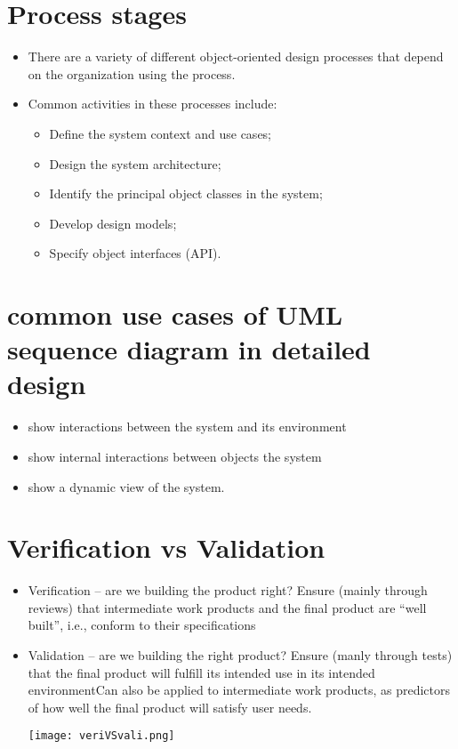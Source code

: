 \documentclass[../ESOF_notes.tex]{subfiles}
\begin{document}
\section{Process stages}
    \begin{itemize}
        \item There are a variety of different object-oriented design processes that depend on the organization using the process.
        \item Common activities in these processes include:
        \begin{itemize}
            \item Define the system context and use cases;
            \item Design the system architecture;
            \item Identify the principal object classes in the system;
            \item Develop design models;
            \item Specify object interfaces (API).
        \end{itemize}
    \end{itemize}

\section{common use cases of UML sequence diagram in detailed design}
\begin{itemize}
    \item show interactions between the system and its environment
    \item show internal interactions between objects the system
    \item show a dynamic view of the system.
\end{itemize}
    
\section{Verification vs Validation}
    \begin{itemize}
        \item Verification – are we building the product right?
        \newline Ensure (mainly through reviews) that intermediate work products and the final product are “well built”, i.e., conform to their specifications
        \item Validation – are we building the right product?\newline
        Ensure (manly through tests) that the final product will fulfill its intended use in its intended environment\newline Can also be applied to intermediate work products, as predictors of how well the final product will satisfy user needs.
        \begin{center}            \texttt{[image: veriVSvali.png]}
        \end{center}
    \end{itemize}
    
\end{document}
